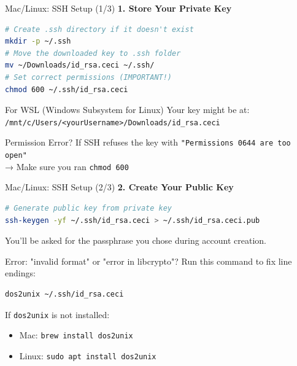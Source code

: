 \documentclass[aspectratio=169]{beamer}
\begin{document}
\begin{frame}[fragile]{Mac/Linux: SSH Setup (1/3)}
\textbf{1. Store Your Private Key}

\begin{lstlisting}[language=bash]
# Create .ssh directory if it doesn't exist
mkdir -p ~/.ssh
# Move the downloaded key to .ssh folder
mv ~/Downloads/id_rsa.ceci ~/.ssh/
# Set correct permissions (IMPORTANT!)
chmod 600 ~/.ssh/id_rsa.ceci
\end{lstlisting}

\vspace{0.2em}
\begin{alertblock}{For WSL (Windows Subsystem for Linux)}
Your key might be at:\\
\texttt{/mnt/c/Users/<yourUsername>/Downloads/id\_rsa.ceci}
\end{alertblock}

\vspace{0.2em}
\begin{alertblock}{Permission Error?}
If SSH refuses the key with \texttt{"Permissions 0644 are too open"}\\
→ Make sure you ran \texttt{chmod 600}
\end{alertblock}
\end{frame}

\begin{frame}[fragile]{Mac/Linux: SSH Setup (2/3)}
\textbf{2. Create Your Public Key}

\begin{lstlisting}[language=bash]
# Generate public key from private key
ssh-keygen -yf ~/.ssh/id_rsa.ceci > ~/.ssh/id_rsa.ceci.pub
\end{lstlisting}

You'll be asked for the passphrase you chose during account creation.

\vspace{1em}
\begin{alertblock}{Error: "invalid format" or "error in libcrypto"?}
Run this command to fix line endings:
\begin{lstlisting}[language=bash]
dos2unix ~/.ssh/id_rsa.ceci
\end{lstlisting}

If \texttt{dos2unix} is not installed:
\begin{itemize}
    \item Mac: \texttt{brew install dos2unix}
    \item Linux: \texttt{sudo apt install dos2unix}
\end{itemize}
\end{alertblock}
\end{frame}
\end{document}
